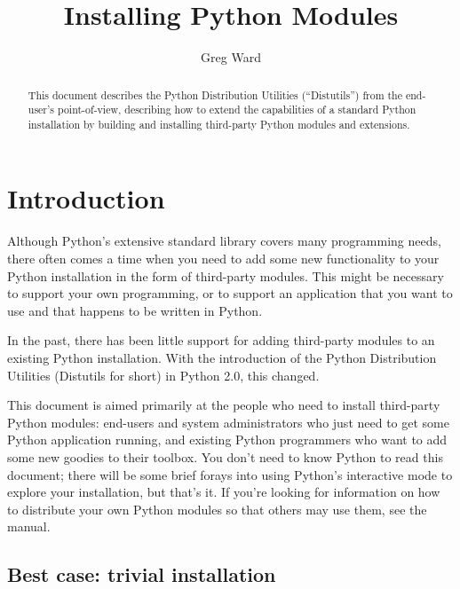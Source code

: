 \documentclass{howto}
\title{Installing Python Modules}
\author{Greg Ward}
\begin{document}
\maketitle

\begin{abstract}
  \noindent
  This document describes the Python Distribution Utilities
  (``Distutils'') from the end-user's point-of-view, describing how to
  extend the capabilities of a standard Python installation by building
  and installing third-party Python modules and extensions.
\end{abstract}



%
\tableofcontents


\section{Introduction}
\label{intro}

Although Python's extensive standard library covers many programming
needs, there often comes a time when you need to add some new
functionality to your Python installation in the form of third-party
modules.  This might be necessary to support your own programming, or to
support an application that you want to use and that happens to be
written in Python.

In the past, there has been little support for adding third-party
modules to an existing Python installation.  With the introduction of
the Python Distribution Utilities (Distutils for short) in Python 2.0,
this changed.

This document is aimed primarily at the people who need to install
third-party Python modules: end-users and system administrators who just
need to get some Python application running, and existing Python
programmers who want to add some new goodies to their toolbox.  You
don't need to know Python to read this document; there will be some
brief forays into using Python's interactive mode to explore your
installation, but that's it.  If you're looking for information on how
to distribute your own Python modules so that others may use them, see
the  manual.


\subsection{Best case: trivial installation}
\label{trivial-install}
\end{document}
